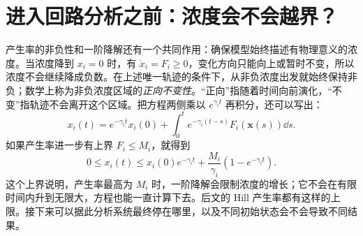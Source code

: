 \section{进入回路分析之前：浓度会不会越界？}
产生率的非负性和一阶降解还有一个共同作用：确保模型始终描述有物理意义的浓度。当浓度降到 $x_i=0$ 时，有 $\dot x_i=F_i\geq0$，变化方向只能向上或暂时不变，所以浓度不会继续降成负数。在上述唯一轨迹的条件下，从非负浓度出发就始终保持非负；数学上称为非负浓度区域的\emph{正向不变性}。“正向”指随着时间向前演化，“不变”指轨迹不会离开这个区域。把方程两侧乘以 $e^{\gamma_i t}$ 再积分，还可以写出：
\[
x_i(t)=e^{-\gamma_it}x_i(0)+\int_0^t e^{-\gamma_i(t-s)}F_i(\bm x(s))\dd s.
\]
如果产生率进一步有上界 $F_i\leq M_i$，就得到
\begin{equation}
0\leq x_i(t)\leq x_i(0)e^{-\gamma_it}+\frac{M_i}{\gamma_i}(1-e^{-\gamma_it}).\label{eq:bound}
\end{equation}
这个上界说明，产生率最高为 $M_i$ 时，一阶降解会限制浓度的增长；它不会在有限时间内升到无限大，方程也能一直计算下去。后文的 Hill 产生率都有这样的上限。接下来可以据此分析系统最终停在哪里，以及不同初始状态会不会导致不同结果。
